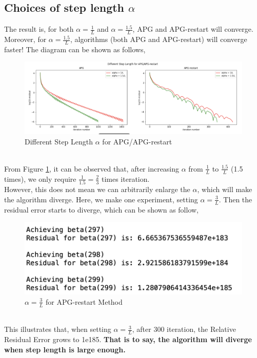 \documentclass{article}
\begin{document}
\subsection{Choices of step length $\alpha$}
The result is, for both $\alpha = \frac{1}{L}$ and $\alpha = \frac{1.5}{L}$, APG and APG-restart will converge. Moreover, for $\alpha = \frac{1.5}{L}$, algorithms (both APG and APG-restart) will converge faster! The diagram can be shown as follows,
\begin{figure}[h]
	\centering
	\includegraphics[width=.55\textheight]{f1.png}
	\caption{Different Step Length $\alpha$ for APG/APG-restart}
	\label{fig:004}
\end{figure}
\\
From Figure \ref{fig:004}, it can be observed that, after increasing $\alpha$ from $\frac{1}{L}$ to $\frac{1.5}{L}$ (1.5 times), we only require $\frac{1}{1.5} = \frac{2}{3}$ times iteration.
\vspace{4pt}
\\
However, this does not mean we can arbitrarily enlarge the $\alpha$, which will make the algorithm diverge. Here, we make one experiment, setting $\alpha = \frac{3}{L}$. Then the residual error starts to diverge, which can be shown as follow,
\begin{figure}[h]
	\centering
	\includegraphics[width=.4\textheight]{f2.png}
	\caption{$\alpha = \frac{3}{L}$ for APG-restart Method}
	\label{fig:005}
\end{figure}
\\
This illustrates that, when setting $\alpha = \frac{3}{L}$, after 300 iteration, the Relative Residual Error grows to 1e185. \textbf{That is to say, the algorithm will diverge when step length is large enough.}
\end{document}
